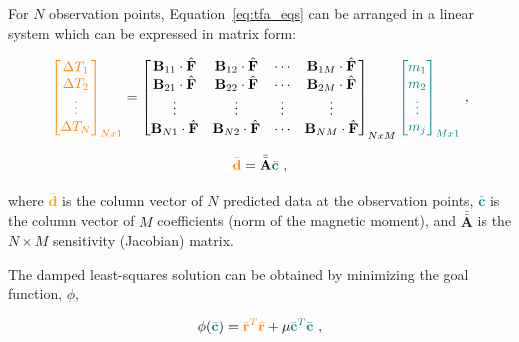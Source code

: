 For $N$ observation points, Equation~\ref{eq:tfa_eqs} can be arranged in a linear system which can be expressed in matrix form:

\begin{equation}
\textcolor{orange}{\begin{bmatrix}
    \Delta T_1 \\ \Delta T_2 \\ \vdots \\ \Delta T_N
\end{bmatrix}_{Nx1}} = \begin{bmatrix}
    \mathbf{B}_{11} \cdot \hat{\mathbf{F}} & \mathbf{B}_{12} \cdot \hat{\mathbf{F}} & \cdots & \mathbf{B}_{1M} \cdot \hat{\mathbf{F}} \\
    \mathbf{B}_{21} \cdot \hat{\mathbf{F}} & \mathbf{B}_{22} \cdot \hat{\mathbf{F}} & \cdots & \mathbf{B}_{2M} \cdot \hat{\mathbf{F}} \\
    \vdots & \vdots & \vdots & \vdots \\
    \mathbf{B}_{N1} \cdot \hat{\mathbf{F}} & \mathbf{B}_{N2} \cdot \hat{\mathbf{F}} & \cdots & \mathbf{B}_{NM} \cdot \hat{\mathbf{F}} \\
\end{bmatrix}_{NxM} \textcolor{teal}{\begin{bmatrix}
    m_1 \\ m_2 \\ \vdots \\ m_j
\end{bmatrix}_{Mx1}} \ ,
\end{equation}

\begin{equation}
    \textcolor{orange}{\bar{\mathbf{d}}} = \bar{\bar{\mathbf{A}}} \textcolor{teal}{\bar{\mathbf{c}}}
    \ ,
\end{equation}

\noindent
where \textcolor{orange}{$\bar{\mathbf{d}}$} is the column vector of $N$ predicted data at the observation points, \textcolor{teal}{$\bar{\mathbf{c}}$} is the column vector of $M$ coefficients (norm of the magnetic moment), and $\bar{\bar{\mathbf{A}}}$ is the $N \times M$ sensitivity (Jacobian) matrix. 


The damped least-squares solution can be obtained by minimizing the goal function, $\phi$, 

\begin{equation}
\label{eq:goal_function}
    \phi(\textcolor{teal}{\bar{\mathbf{c}}}) = \textcolor{orange}{\bar{\mathbf{r}}^T\bar{\mathbf{r}}} + \mu \textcolor{teal}{\bar{\mathbf{c}}^T\bar{\mathbf{c}}}
    \ ,
\end{equation}


